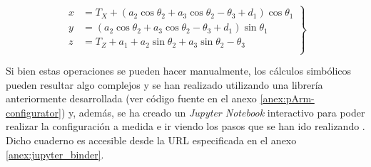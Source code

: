 \begin{equation}
    \label{eq:from_thetas_to_xyz}
    \left.\begin{aligned}
        x & = T_{X} + \left(a_{2} \cos{\theta_{2}} + a_{3} \cos{\theta_{2} - \theta_{3}} + d_{1}\right) \cos{\theta_{1}} \\
        y & = \left(a_{2} \cos{\theta_{2}} + a_{3} \cos{\theta_{2} - \theta_{3}} + d_{1}\right) \sin{\theta_{1}}         \\
        z & = T_{Z} + a_{1} + a_{2} \sin{\theta_{2}} + a_{3} \sin{\theta_{2} - \theta_{3}}                               \\
    \end{aligned}
    \right\}
\end{equation}

Si bien estas operaciones se pueden hacer manualmente, los cálculos simbólicos pueden
resultar algo complejos y se han realizado utilizando una librería anteriormente
desarrollada \cite{UPMRoboticsUarm2019b}
(ver código fuente en el anexo \ref{anex:pArm-configurator}) y, además, se ha creado
un \textit{Jupyter Notebook} interactivo para poder realizar la configuración a medida
e ir viendo los pasos que se han ido realizando \cite{PArmTFGPArmconfigurator2020}.
Dicho cuaderno es accesible desde la URL especificada en el anexo \ref{anex:jupyter_binder}.

